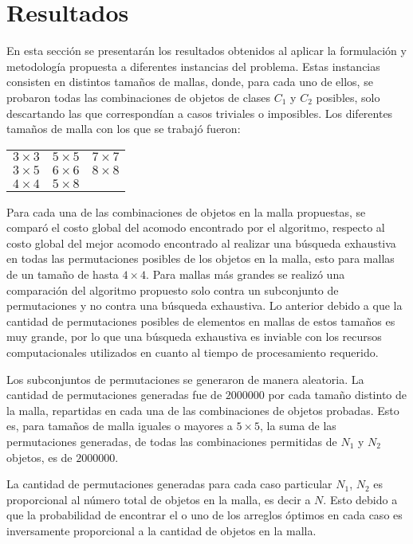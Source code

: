 \chapter{Resultados}
\label{chap:resultados}
%
%
En esta sección se presentarán los resultados obtenidos al aplicar la formulación y metodología propuesta a diferentes instancias del problema.
Estas instancias consisten en distintos tamaños de mallas, donde, para cada uno de ellos, se probaron todas las combinaciones de objetos de clases $C_1$ y $C_2$ posibles, solo descartando las que correspondían a casos triviales o imposibles.
Los diferentes tamaños de malla con los que se trabajó fueron: 
%
\begin{center}
\renewcommand{\arraystretch}{1.2}%
\begin{tabular}{w{c}{2cm} w{c}{2cm} w{c}{2cm}}
	\toprule[\arrayrulewidth]
	\toprule[\arrayrulewidth]
	$3\times 3$ & $5\times 5$ & $7\times 7$ \\
	$3\times 5$ & $6\times 6$ & $8\times 8$ \\
	$4\times 4$ & $5\times 8$ & \\
	\bottomrule[\arrayrulewidth]
	\bottomrule[\arrayrulewidth]
\end{tabular}
\end{center}
%
Para cada una de las combinaciones de objetos en la malla propuestas, se comparó el costo global del acomodo encontrado por el algoritmo, respecto al costo global del mejor acomodo encontrado al realizar una búsqueda exhaustiva en todas las permutaciones posibles de los objetos en la malla, esto para mallas de un tamaño de hasta $4\times 4$. 
Para mallas más grandes se realizó una comparación del algoritmo propuesto solo contra un subconjunto de permutaciones y no contra una búsqueda exhaustiva.
Lo anterior debido a que la cantidad de permutaciones posibles de elementos en mallas de estos tamaños es muy grande, por lo que una búsqueda exhaustiva es inviable con los recursos computacionales utilizados en cuanto al tiempo de procesamiento requerido.

Los subconjuntos de permutaciones se generaron de manera aleatoria. 
La cantidad de permutaciones generadas fue de $\num{2000000}$ por cada tamaño distinto de la malla, repartidas en cada una de las combinaciones de objetos probadas.
Esto es, para tamaños de malla iguales o mayores a $5 \times 5$, la suma de las permutaciones generadas, de todas las combinaciones permitidas de $N_1$ y $N_2$ objetos, es de $\num{2000000}$.

La cantidad de permutaciones generadas para cada caso particular $N_1$, $N_2$ es proporcional al número total de objetos en la malla, es decir a $N$.
Esto debido a que la probabilidad de encontrar el o uno de los arreglos óptimos en cada caso es inversamente proporcional a la cantidad de objetos en la malla.

